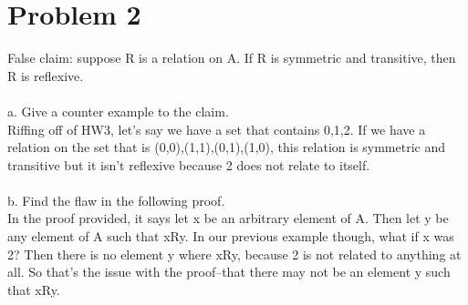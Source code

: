 \documentclass{article}
\begin{document}
\section{Problem 2}
False claim: suppose R is a relation on A. If R is symmetric and transitive, then R is reflexive. \\\\
a. Give a counter example to the claim.
\\
Riffing off of HW3, let's say we have a set that contains {0,1,2}. If we have a relation on the set that is {(0,0),(1,1),(0,1),(1,0)}, this relation is symmetric and transitive but it isn't reflexive because 2 does not relate to itself.
\\\\
b. Find the flaw in the following proof.
\\
In the proof provided, it says let x be an arbitrary element of A. Then let y be any element of A such that xRy. In our previous example though, what if x was 2? Then there is no element y where xRy, because 2 is not related to anything at all. So that's the issue with the proof--that there may not be an element y such that xRy. 
\\\\
\end{document}

